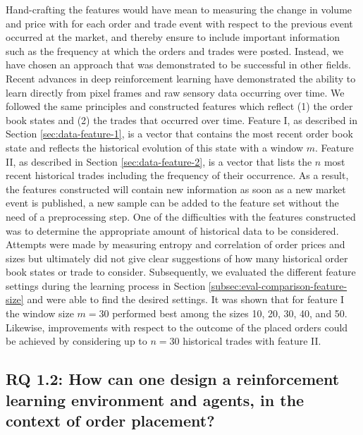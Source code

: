 Hand-crafting the features would have mean to measuring the change in volume and price with for each order and trade event with respect to the previous event occurred at the market, and thereby ensure to include important information such as the frequency at which the orders and trades were posted.
Instead, we have chosen an approach that was demonstrated to be successful in other fields.
Recent advances in deep reinforcement learning have demonstrated the ability to learn directly from pixel frames\cite{mnih2013playing} and raw sensory data\cite{mnih2015human} occurring over time.
We followed the same principles and constructed features which reflect (1) the order book states and (2) the trades that occurred over time.
Feature I, as described in Section \ref{sec:data-feature-1}, is a vector that contains the most recent order book state and reflects the historical evolution of this state with a window $m$.
Feature II, as described in Section \ref{sec:data-feature-2}, is a vector that lists the $n$ most recent historical trades including the frequency of their occurrence.
As a result, the features constructed will contain new information as soon as a new market event is published, a new sample can be added to the feature set without the need of a preprocessing step.
One of the difficulties with the features constructed was to determine the appropriate amount of historical data to be considered.
Attempts were made by measuring entropy and correlation of order prices and sizes but ultimately did not give clear suggestions of how many historical order book states or trade to consider.
Subsequently, we evaluated the different feature settings during the learning process in Section \ref{subsec:eval-comparison-feature-size} and were able to find the desired settings.
It was shown that for feature I the window size $m=30$ performed best among the sizes 10, 20, 30, 40, and 50.
Likewise, improvements with respect to the outcome of the placed orders could be achieved by considering up to $n=30$ historical trades with feature II.

\subsection{RQ 1.2: How can one design a reinforcement learning environment and agents, in the context of order placement?}

